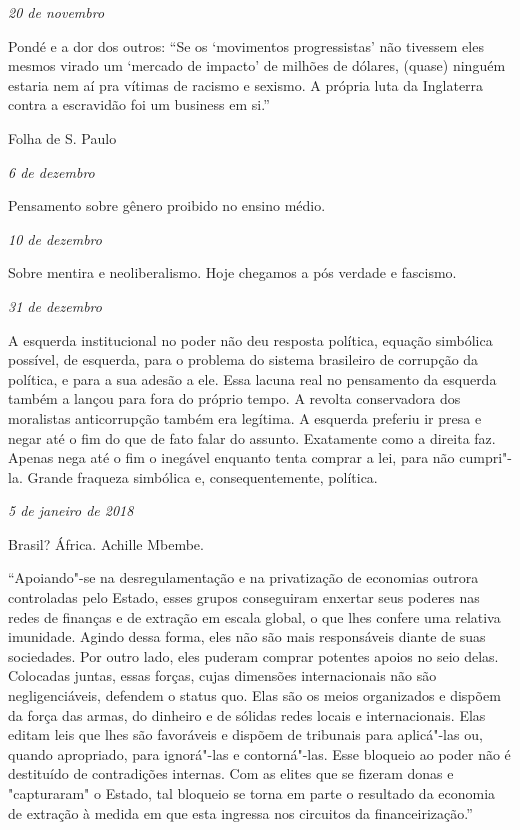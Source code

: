 \begin{flushright}
\emph{20 de novembro}
\end{flushright}

Pondé e a dor dos outros: ``Se os `movimentos progressistas' não
tivessem eles mesmos virado um `mercado de impacto' de milhões de
dólares, (quase) ninguém estaria nem aí pra vítimas de racismo e
sexismo. A própria luta da Inglaterra contra a escravidão foi um
business em si.''

Folha de S. Paulo

\begin{flushright}
\emph{6 de dezembro}
\end{flushright}

Pensamento sobre gênero proibido no ensino médio.

\pagebreak

\begin{flushright}
\emph{10 de dezembro}
\end{flushright}

Sobre mentira e neoliberalismo. Hoje chegamos a pós verdade e fascismo.

\begin{flushright}
\emph{31 de dezembro}
\end{flushright}

A esquerda institucional no poder não deu resposta política, equação
simbólica possível, de esquerda, para o problema do sistema brasileiro
de corrupção da política, e para a sua adesão a ele. Essa lacuna real no
pensamento da esquerda também a lançou para fora do próprio tempo. A
revolta conservadora dos moralistas anticorrupção também era legítima. A
esquerda preferiu ir presa e negar até o fim do que de fato falar do
assunto. Exatamente como a direita faz. Apenas nega até o fim o inegável
enquanto tenta comprar a lei, para não cumpri"-la. Grande fraqueza
simbólica e, consequentemente, política.

\begin{flushright}
\emph{5 de janeiro de 2018}
\end{flushright}

Brasil? África. Achille Mbembe.

``Apoiando"-se na desregulamentação e na privatização de economias
outrora controladas pelo Estado, esses grupos conseguiram enxertar seus
poderes nas redes de finanças e de extração em escala global, o que lhes
confere uma relativa imunidade. Agindo dessa forma, eles não são mais
responsáveis diante de suas sociedades. Por outro lado, eles puderam
comprar potentes apoios no seio delas. Colocadas juntas, essas forças,
cujas dimensões internacionais não são negligenciáveis, defendem o
status quo. Elas são os meios organizados e dispõem da força das armas,
do dinheiro e de sólidas redes locais e internacionais. Elas editam leis
que lhes são favoráveis e dispõem de tribunais para aplicá"-las ou,
quando apropriado, para ignorá"-las e contorná"-las. Esse bloqueio ao
poder não é destituído de contradições internas. Com as elites que se
fizeram donas e "capturaram" o Estado, tal bloqueio se torna em parte o
resultado da economia de extração à medida em que esta ingressa nos
circuitos da financeirização.''

